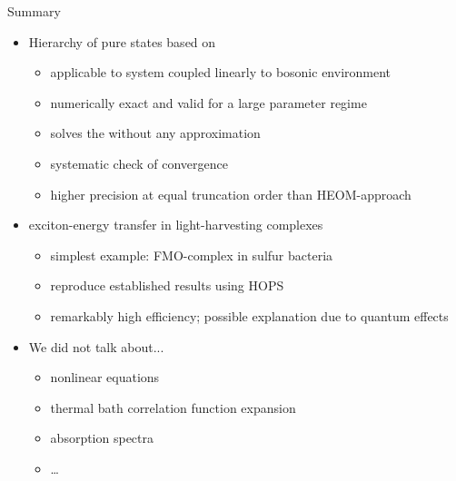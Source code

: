 \documentclass{beamer}
\begin{document}
\begin{frame}[label=summary]{Summary}
  \begin{itemize}
    \item Hierarchy of pure states based on \NMSSE
      \begin{itemize}
        \item applicable to system coupled linearly to bosonic environment
        \item numerically exact and valid for a large parameter regime
        \item solves the  without any approximation
        \item systematic check of convergence
        \item higher precision at equal truncation order than \textsc{HEOM}-approach
      \end{itemize}
    \pause
    \vspace{.3cm}
  \item exciton-energy transfer in light-harvesting complexes
    \begin{itemize}
      \item simplest example: \textsc{FMO}-complex in sulfur bacteria
      \item reproduce established results using \textsc{HOPS}
      \item remarkably high efficiency; possible explanation due to quantum effects
    \end{itemize}
    \pause
    \vspace{.3cm}
  \item We did not talk about...
    \begin{itemize}
      \item nonlinear equations
      \item thermal bath correlation function expansion
      \item absorption spectra
      \item \ldots
    \end{itemize}
  \end{itemize}
\end{frame}
\end{document}
